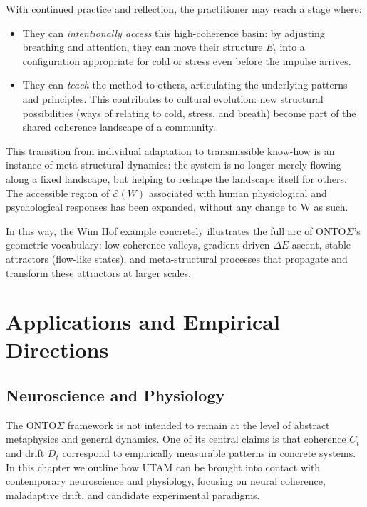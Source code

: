 \documentclass[12pt,a4paper]{report}
\newcommand{\Will}{W}
\begin{document}
With continued practice and reflection, the practitioner may reach a stage where:

\begin{itemize}[leftmargin=2em]
    \item They can \emph{intentionally access} this high-coherence basin: by adjusting breathing and attention, they can move their structure \(E_t\) into a configuration appropriate for cold or stress even before the impulse arrives.
    \item They can \emph{teach} the method to others, articulating the underlying patterns and principles. This contributes to cultural evolution: new structural possibilities (ways of relating to cold, stress, and breath) become part of the shared coherence landscape of a community.
\end{itemize}

This transition from individual adaptation to transmissible know-how is an instance of meta-structural dynamics: the system is no longer merely flowing along a fixed landscape, but helping to reshape the landscape itself for others. The accessible region of \(\mathcal{E}(\Will)\) associated with human physiological and psychological responses has been expanded, without any change to \Will{} as such.

In this way, the Wim Hof example concretely illustrates the full arc of ONTO$\Sigma$'s geometric vocabulary: low-coherence valleys, gradient-driven $\Delta E$ ascent, stable attractors (flow-like states), and meta-structural processes that propagate and transform these attractors at larger scales.


\part{Applications and Empirical Directions}

\chapter{Neuroscience and Physiology}

The ONTO$\Sigma$ framework is not intended to remain at the level of abstract metaphysics and general dynamics. One of its central claims is that coherence \(C_t\) and drift \(D_t\) correspond to empirically measurable patterns in concrete systems. In this chapter we outline how UTAM can be brought into contact with contemporary neuroscience and physiology, focusing on neural coherence, maladaptive drift, and candidate experimental paradigms.
\end{document}
